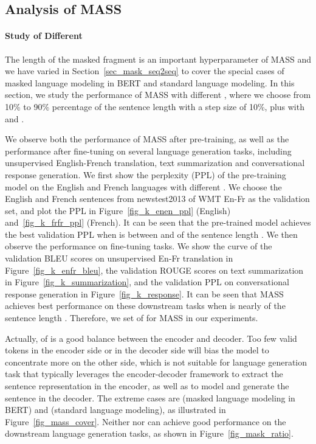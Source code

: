 \documentclass{article}
\begin{document}
	\subsection{Analysis of MASS}
	
	\paragraph{Study of Different } The length of the masked fragment  is an important hyperparameter of MASS and we have varied  in Section~\ref{sec_mask_seq2seq} to cover the special cases of masked language modeling in BERT and standard language modeling. In this section, we study the performance of MASS with different , where we choose  from 10\% to 90\% percentage of the sentence length  with a step size of 10\%, plus with  and .
	
	We observe both the performance of MASS after pre-training, as well as the performance after fine-tuning on several language generation tasks, including unsupervised English-French translation, text summarization and conversational response generation. We first show the perplexity (PPL) of the pre-training model on the English and French languages with different . We choose the English and French sentences from newstest2013 of WMT En-Fr as the validation set, and plot the PPL in  Figure~\ref{fig_k_enen_ppl} (English) and~\ref{fig_k_frfr_ppl} (French). It can be seen that the pre-trained model achieves the best validation PPL when  is between  and  of the sentence length . We then observe the performance on fine-tuning tasks. We show the curve of the validation BLEU scores on unsupervised En-Fr translation in Figure~\ref{fig_k_enfr_bleu}, the validation ROUGE scores on text summarization in Figure~\ref{fig_k_summarization}, and the validation PPL on conversational response generation in Figure~\ref{fig_k_response}. It can be seen that MASS achieves best performance on these downstream tasks when  is nearly  of the sentence length . Therefore, we set  of  for MASS in our experiments.
	
	Actually,  of  is a good balance between the encoder and decoder. Too few valid tokens in the encoder side or in the decoder side will bias the model to concentrate more on the other side, which is not suitable for language generation task that typically leverages the encoder-decoder framework to extract the sentence representation in the encoder, as well as to model and generate the sentence in the decoder. The extreme cases are  (masked language modeling in BERT) and  (standard language modeling), as illustrated in Figure~\ref{fig_mass_cover}. Neither  nor  can achieve good performance on the downstream language generation tasks, as shown in Figure~\ref{fig_mask_ratio}. 
	
\end{document}
